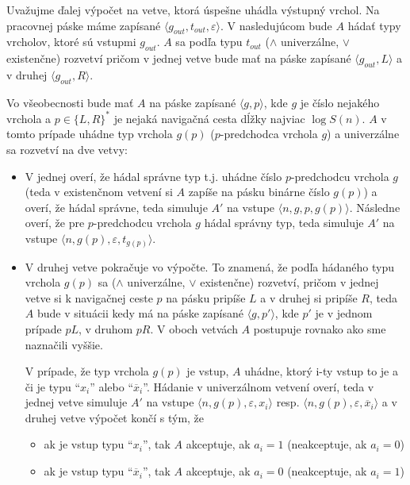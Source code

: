 {\begin{dokaz}
  Uvažujme ďalej výpočet na vetve, ktorá úspešne uhádla výstupný
  vrchol. Na pracovnej páske máme zapísané $\langle
  g_{out},t_{out},\varepsilon\rangle $. V nasledujúcom bude $A$
  hádať typy vrcholov, ktoré sú vstupmi $g_{out}$. $A$ sa podľa typu
  $t_{out}$ ($\wedge$ univerzálne, $\vee$ existenčne) rozvetví
  pričom v jednej vetve bude mať na páske zapísané $\langle
  g_{out},L\rangle $ a v druhej $\langle g_{out},R\rangle $.

  Vo všeobecnosti bude mať $A$ na páske zapísané $\langle g,p\rangle $,
  kde $g$ je číslo nejakého vrchola a $p\in\{ L,R\}^*$ je nejaká
  navigačná cesta dĺžky najviac $\log S(n)$. $A$ v tomto prípade
  uhádne typ vrchola $g(p)$ ($p$-predchodca vrchola $g$) a univerzálne
  sa rozvetví na dve vetvy:
  \begin{itemize}
    \item V jednej overí, že hádal správne typ t.j. uhádne číslo
    $p$-predchodcu vrchola $g$ (teda v existenčnom vetvení si $A$
    zapíše na pásku binárne číslo $g(p)$) a overí, že hádal správne,
    teda simuluje $A'$ na vstupe $\langle n,g,p,g(p)\rangle $. Následne overí, že
    pre $p$-predchodcu vrchola $g$ hádal správny typ, teda simuluje
    $A'$ na vstupe $\langle n,g(p),\varepsilon,t_{g(p)}\rangle $.
    \item V druhej vetve pokračuje vo výpočte. To znamená, že podľa
    hádaného typu vrchola $g(p)$ sa ($\wedge$ univerzálne, $\vee$
    existenčne) rozvetví, pričom v jednej vetve si k navigačnej
    ceste $p$ na pásku pripíše $L$ a v druhej si pripíše $R$, teda
    $A$ bude v situácii kedy má na páske zapísané $\langle g,p'\rangle $, kde $p'$
    je v jednom prípade $pL$, v druhom $pR$. V oboch vetvách $A$
    postupuje rovnako ako sme naznačili vyššie.

    V prípade, že typ vrchola $g(p)$ je vstup, $A$ uhádne, ktorý
    i-ty vstup to je a či je typu ``$x_i$'' alebo
    ``$\overline{x}_i$''. Hádanie v univerzálnom vetvení overí, teda
    v jednej vetve simuluje $A'$ na vstupe
    $\langle n,g(p),\varepsilon,x_i\rangle $ resp.
    $\langle n,g(p),\varepsilon,\overline{x}_i\rangle $ a v druhej vetve výpočet
    končí s tým, že
    \begin{itemize}
      \item ak je vstup typu ``$x_i$'', tak $A$ akceptuje, ak $a_i=1$
      (neakceptuje, ak $a_i=0$)
      \item ak je vstup typu ``$\overline{x}_i$'', tak $A$
      akceptuje, ak $a_i=0$ (neakceptuje, ak $a_i=1$)
    \end{itemize}
  \end{itemize}


\end{dokaz}}
